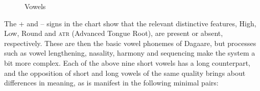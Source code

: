 \begin{figure}
%
%
%



\caption{Vowels}
    \label{tabfig:Vowels}

\end{figure}


\newpage
The + and -- signs in the chart show that the relevant distinctive features, High, Low, Round and \textsc{atr} (Advanced Tongue Root), are present or absent, respectively. These are then the basic vowel phonemes of Dagaare, but processes such as vowel lengthening, nasality, harmony and sequencing make the system a bit more complex. Each of the above  nine short vowels has a long counterpart, and the opposition of short and long vowels of the same
quality brings about differences in meaning, as is manifest in the following minimal pairs:



